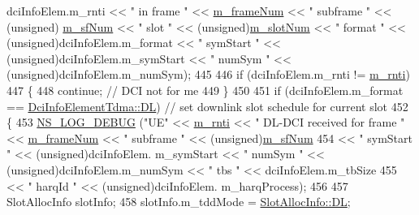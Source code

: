 \begin{DoxyCode}
      dciInfoElem.m\_rnti << \textcolor{stringliteral}{" in frame "} << \hyperlink{classns3_1_1MmWavePhy_a852ce585035a1c12122d2775e64ff38a}{m\_frameNum} << \textcolor{stringliteral}{" subframe "} << (\textcolor{keywordtype}{unsigned})
      \hyperlink{classns3_1_1MmWavePhy_af3d76eb9f3e5e1ff669852d05986c1a3}{m\_sfNum} << \textcolor{stringliteral}{" slot "} << (\textcolor{keywordtype}{unsigned})\hyperlink{classns3_1_1MmWavePhy_a6c83cdb8c36a9a58ae8b9f17933680ac}{m\_slotNum} << \textcolor{stringliteral}{" format "} << (\textcolor{keywordtype}{unsigned})dciInfoElem.m\_format 
      << \textcolor{stringliteral}{" symStart "} << (\textcolor{keywordtype}{unsigned})dciInfoElem.m\_symStart << \textcolor{stringliteral}{" numSym "} << (\textcolor{keywordtype}{unsigned})dciInfoElem.m\_numSym);
445 
446                         \textcolor{keywordflow}{if} (dciInfoElem.m\_rnti != \hyperlink{classns3_1_1MmWaveUePhy_aae63c66b69de47ac19b4033ecf4bc211}{m\_rnti})
447                         \{
448                                 \textcolor{keywordflow}{continue}; \textcolor{comment}{// DCI not for me}
449                         \}
450 
451                         \textcolor{keywordflow}{if} (dciInfoElem.m\_format == \hyperlink{structns3_1_1DciInfoElementTdma_af998ccd3b1e03836c113d353facc76f4a6497273a219b44fa44ea3a6ea608bfcb}{DciInfoElementTdma::DL}) \textcolor{comment}{// set
       downlink slot schedule for current slot}
452                         \{
453                                 \hyperlink{group__logging_ga413f1886406d49f59a6a0a89b77b4d0a}{NS\_LOG\_DEBUG} (\textcolor{stringliteral}{"UE"} << \hyperlink{classns3_1_1MmWaveUePhy_aae63c66b69de47ac19b4033ecf4bc211}{m\_rnti} << \textcolor{stringliteral}{" DL-DCI received for
       frame "} << \hyperlink{classns3_1_1MmWavePhy_a852ce585035a1c12122d2775e64ff38a}{m\_frameNum} << \textcolor{stringliteral}{" subframe "} << (\textcolor{keywordtype}{unsigned})\hyperlink{classns3_1_1MmWavePhy_af3d76eb9f3e5e1ff669852d05986c1a3}{m\_sfNum}
454                                                                 << \textcolor{stringliteral}{" symStart "} << (\textcolor{keywordtype}{unsigned})dciInfoElem.
      m\_symStart << \textcolor{stringliteral}{" numSym "} << (\textcolor{keywordtype}{unsigned})dciInfoElem.m\_numSym  << \textcolor{stringliteral}{" tbs "} << dciInfoElem.m\_tbSize
455                                                                 << \textcolor{stringliteral}{" harqId "} << (\textcolor{keywordtype}{unsigned})dciInfoElem.
      m\_harqProcess);
456 
457                                 SlotAllocInfo slotInfo;
458                                 slotInfo.m\_tddMode = \hyperlink{structns3_1_1SlotAllocInfo_a6cad60db1d39034f1851e2cea625fe5da9a365c9c56b7c32dcae38ee1a468ce6d}{SlotAllocInfo::DL};

\end{DoxyCode}
